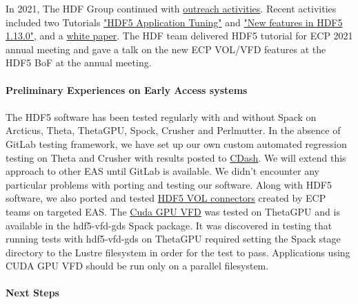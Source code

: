 In 2021, The HDF Group continued with \href{https://www.hdfgroup.org/category/hdf5-resources-for-ecp-users/}{outreach activities}. Recent activities included two Tutorials \href{https://www.hdfgroup.org/2021/05/webinar-followup-hdf5-application-tuning-there-is-more-than-one-way-to-skin-a-catfish-part-2/} {"HDF5 Application Tuning"} and \href{https://www.hdfgroup.org/2021/09/webinar-followup-new-features-in-the-hdf5-1-13-0-release}{"New features in HDF5 1.13.0"}, and a \href{https://portal.hdfgroup.org/pages/viewpage.action?pageId=73924784}{white paper}. The HDF team delivered HDF5 tutorial for ECP 2021 annual meeting and gave a talk on the new ECP VOL/VFD features at the HDF5 BoF at the annual meeting.

\paragraph{Preliminary Experiences on Early Access systems}
\paragraph{}
The HDF5 software has been tested regularly with and without Spack on Arcticus, Theta, ThetaGPU, Spock, Crusher and Perlmutter.  In the absence of GitLab testing framework, we have set up our own custom automated regression testing on Theta and Crusher with results posted to \href{https://cdash.hdfgroup.org}{CDash}.  We will extend this approach to other EAS until GitLab is available.  We didn't encounter any particular problems with porting and testing our software.  Along with HDF5 software, we also ported and tested \href{https://portal.hdfgroup.org/display/support/Registered+VOL+Connectors}{HDF5 VOL connectors} created by ECP teams on targeted EAS.  The \href{https://portal.hdfgroup.org/pages/viewpage.action?pageId=74188097}{Cuda GPU VFD} was tested on ThetaGPU and is available in the hdf5-vfd-gds Spack package.  It was discovered in testing that running tests with hdf5-vfd-gds on ThetaGPU required setting the Spack stage directory to the Lustre filesystem in order for the test to pass.  Applications using CUDA GPU VFD should be run only on a parallel filesystem. 

\paragraph{Next Steps}
